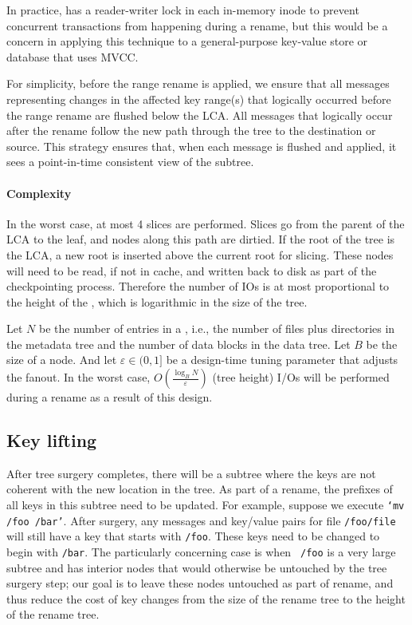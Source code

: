 In practice, \betrfs has a reader-writer lock in each in-memory inode to prevent
concurrent transactions from happening during a rename,
but this would be a concern in applying this technique to a general-purpose
key-value store or database that uses MVCC.

For simplicity, before the range rename is applied, we ensure that all messages
representing changes in the affected key range(s) that logically occurred before
the range rename are flushed below the LCA.
All messages that logically occur after the rename follow the new path through
the tree to the destination or source.
This strategy ensures that, when each message is flushed and applied, it sees a
point-in-time consistent view of the subtree.

\paragraph{Complexity} In the worst case, at most 4 slices are performed.
Slices go from the parent of the LCA to the leaf,
and nodes along this path are dirtied.
If the root of the tree is the LCA, a new root is inserted above the current
root for slicing.
These nodes will need to be read, if not in cache,
and written back to disk as part of the checkpointing process.
Therefore the number of IOs is at most proportional to the height of the \bet,
which is logarithmic in the size of the tree.

Let $N$ be the number of entries in a \bet, i.e., the number of files plus
directories in the metadata tree and the number of data blocks in the data tree.
Let $B$ be the size of a node.
And let $\varepsilon\in(0,1]$ be a design-time tuning parameter that adjusts the
fanout.
In the worst case, $O(\frac{\log_B{N}}{\varepsilon})$ (tree height)
I/Os will be performed  during a rename as a result of this design.

\subsection{Key lifting}

After tree surgery completes, there will be a subtree where the keys
are not coherent with the new location in the tree.  As part of a
rename, the prefixes of all keys in this subtree need to be updated.
For example, suppose we execute \texttt{`mv /foo /bar'}.  After surgery,
any messages and
key/value pairs for file \texttt{/foo/file} will still have a key that
starts with \texttt{/foo}.  These keys need to be changed to begin
with \texttt{/bar}.  The particularly concerning case is when {\tt
  /foo} is a very large subtree and has interior nodes that would
otherwise be untouched by the tree surgery step; our goal is to leave
these nodes untouched as part of rename, and thus reduce the cost of
key changes from the size of the rename tree to the height of the
rename tree.

